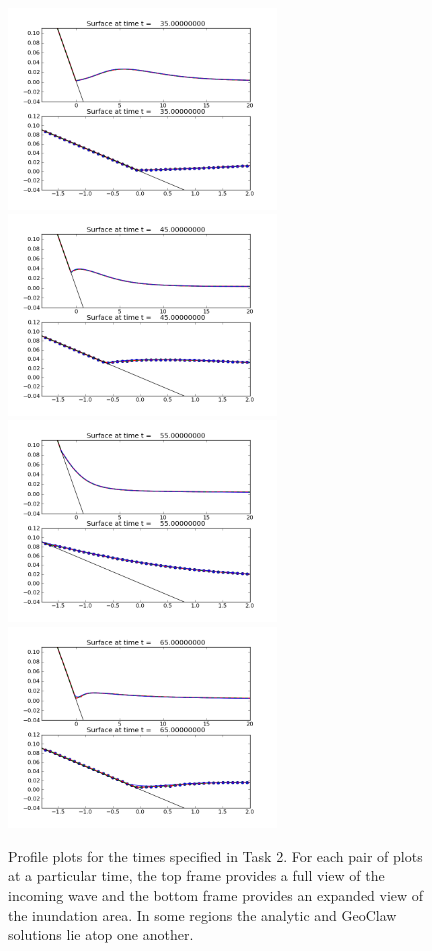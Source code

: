 \begin{figure}[ht]
\hfil\includegraphics[width=2.8in]{bp1/frame0001fig2.png}\hfil
\hfil\includegraphics[width=2.8in]{bp1/frame0003fig2.png}\hfil
\vskip 5pt
\hfil\includegraphics[width=2.8in]{bp1/frame0005fig2.png}\hfil
\hfil\includegraphics[width=2.8in]{bp1/frame0007fig2.png}\hfil
\caption{\label{fig:bp1frames} 
Profile plots for the times specified in Task 2.  For each pair of plots at a particular time, the top frame provides a full view of the incoming wave and the bottom frame provides an expanded view of the inundation area. In some regions the analytic and GeoClaw solutions lie atop one another.}
\end{figure}

